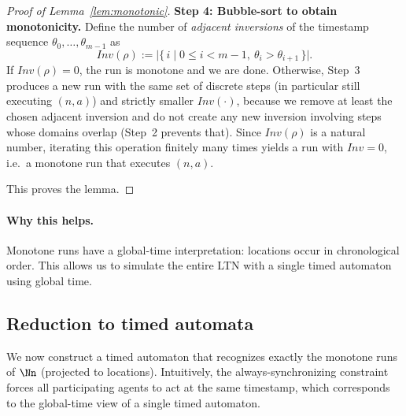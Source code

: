 \begin{proof}[Proof of Lemma~\ref{lem:monotonic}]
\medskip\noindent
\textbf{Step 4: Bubble-sort to obtain monotonicity.}
Define the number of \emph{adjacent inversions} of the timestamp sequence
$\theta_0,\ldots,\theta_{m-1}$ as
\[
Inv(\rho) := \bigl|\{\,i \mid 0\le i<m-1,\ \theta_i>\theta_{i+1}\,\}\bigr|.
\]
If $Inv(\rho)=0$, the run is monotone and we are done.
Otherwise, Step~3 produces a new run with the same set of discrete steps (in
particular still executing $(n,a)$) and strictly smaller $Inv(\cdot)$, because
we remove at least the chosen adjacent inversion and do not create any new
inversion involving steps whose domains overlap (Step~2 prevents that).
Since $Inv(\rho)$ is a natural number, iterating this operation finitely many
times yields a run with $Inv=0$, i.e.\ a monotone run that executes $(n,a)$.

This proves the lemma.
\end{proof}

\paragraph{Why this helps.} Monotone runs have a global-time interpretation: locations occur in chronological order. This allows us to simulate the entire LTN with a single timed automaton using global time.

\subsection{Reduction to timed automata}

We now construct a timed automaton that recognizes exactly the monotone runs of
$\Nn$ (projected to locations). Intuitively, the always-synchronizing constraint
forces all participating agents to act at the same timestamp, which corresponds
to the global-time view of a single timed automaton.

